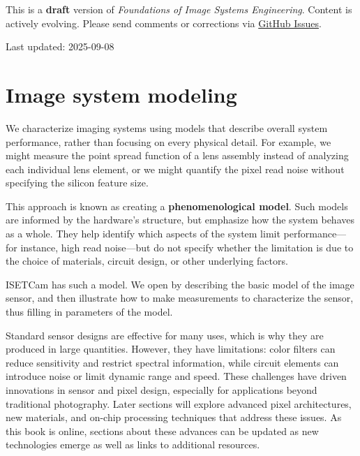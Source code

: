 \documentclass[
  letterpaper,
]{book}
\begin{document}
\begin{tcolorbox}[enhanced jigsaw, colframe=quarto-callout-warning-color-frame, titlerule=0mm, rightrule=.15mm, opacitybacktitle=0.6, colback=white, leftrule=.75mm, coltitle=black, title=\textcolor{quarto-callout-warning-color}{\faExclamationTriangle}\hspace{0.5em}{Work in Progress}, bottomrule=.15mm, colbacktitle=quarto-callout-warning-color!10!white, breakable, left=2mm, bottomtitle=1mm, toptitle=1mm, opacityback=0, arc=.35mm, toprule=.15mm]

This is a \textbf{draft} version of \emph{Foundations of Image Systems
Engineering}. Content is actively evolving. Please send comments or
corrections via \href{https://github.com/wandell/FISE-git/issues}{GitHub
Issues}.

Last updated: 2025-09-08

\end{tcolorbox}

\section{Image system modeling}\label{sensor-system-modeling-overview}

We characterize imaging systems using models that describe overall
system performance, rather than focusing on every physical detail. For
example, we might measure the point spread function of a lens assembly
instead of analyzing each individual lens element, or we might quantify
the pixel read noise without specifying the silicon feature size.

This approach is known as creating a \textbf{phenomenological model}.
Such models are informed by the hardware's structure, but emphasize how
the system behaves as a whole. They help identify which aspects of the
system limit performance---for instance, high read noise---but do not
specify whether the limitation is due to the choice of materials,
circuit design, or other underlying factors.

ISETCam has such a model. We open by describing the basic model of the
image sensor, and then illustrate how to make measurements to
characterize the sensor, thus filling in parameters of the model.

Standard sensor designs are effective for many uses, which is why they
are produced in large quantities. However, they have limitations: color
filters can reduce sensitivity and restrict spectral information, while
circuit elements can introduce noise or limit dynamic range and speed.
These challenges have driven innovations in sensor and pixel design,
especially for applications beyond traditional photography. Later
sections will explore advanced pixel architectures, new materials, and
on-chip processing techniques that address these issues. As this book is
online, sections about these advances can be updated as new technologies
emerge as well as links to additional resources.
\end{document}
